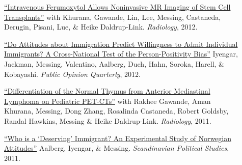 \documentclass[letterpaper,11pt]{article}
\begin{document}
\begin{description}
\item[] \href{http://radiology.rsna.org/content/264/3/803.full.pdf+html}{``Intravenous Ferumoxytol Allows Noninvasive MR Imaging of Stem Cell Transplants''} with Khurana, Gawande, Lin, Lee, Messing, Castaneda, Derugin, Pisani, Lue, \& Heike Daldrup-Link. 
\emph{Radiology}, 2012.

\item[] \href{http://poq.oxfordjournals.org/content/early/2013/09/14/poq.nft024.full.pdf?keytype=ref&ijkey=ynq4b9uNIrXJy3I}{``Do Attitudes about Immigration Predict Willingness to Admit Individual Immigrants? A Cross-National Test of the Person-Positivity Bias''} Iyengar, Jackman, Messing, Valentino, Aalberg, Duch, Hahn, Soroka, Harell, \& Kobayashi. 
\emph{Public Opinion Quarterly}, 2012.

\item[] \href{http://radiology.rsna.org/content/early/2011/12/11/radiol.11110715.long}{``Differentiation of the Normal Thymus from Anterior Mediastinal Lymphoma on Pediatric PET-CTs''} with Rakhee Gawande, Aman Khurana, Messing, Dong Zhang, Rosalinda Castaneda, Robert Goldsby, Randal Hawkins, Messing \& Heike Daldrup-Link. 
\emph{Radiology}, 2011.

\item[] \href{http://onlinelibrary.wiley.com/doi/10.1111/j.1467-9477.2011.00280.x/abstract}{``Who is a `Deserving' Immigrant? An Experimental Study of Norwegian Attitudes''} Aalberg, Iyengar, \& Messing. 
\emph{Scandinavian Political Studies}, 2011.

\end{description}
\end{document}
